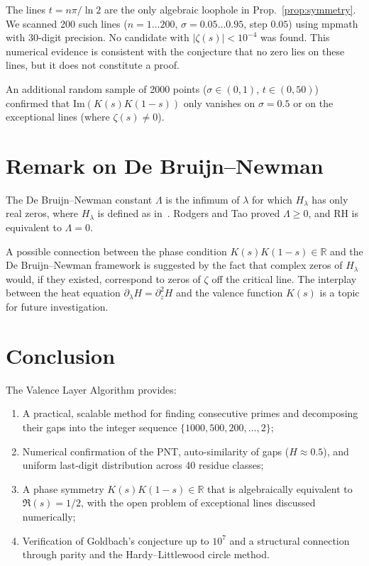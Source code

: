 \documentclass[12pt,a4paper]{article}
\theoremstyle{plain}
\begin{document}
The lines $t=n\pi/\ln2$ are the only algebraic loophole in
Prop.~\ref{prop:symmetry}.  We scanned 200 such lines
($n=1\dots200$, $\sigma=0.05\dots0.95$, step $0.05$) using
mpmath with 30-digit precision.  No candidate with
$|\zeta(s)|<10^{-4}$ was found.  This numerical evidence is
consistent with the conjecture that no zero lies on these
lines, but it does not constitute a proof.

An additional random sample of 2000 points ($\sigma\in(0,1)$,
$t\in(0,50)$) confirmed that Im$(K(s)K(1-s))$ only vanishes on
$\sigma=0.5$ or on the exceptional lines (where $\zeta(s)\neq0$).

\section{Remark on De Bruijn--Newman}
\label{sec:dbn}

The De Bruijn--Newman constant $\Lambda$ is the infimum of $\lambda$
for which $H_\lambda$ has only real zeros, where $H_\lambda$ is
defined as in~\cite{rodgers-tao}.  Rodgers and Tao proved
$\Lambda\ge0$, and RH is equivalent to $\Lambda=0$.

A possible connection between the phase condition
$K(s)K(1-s)\in\mathbb{R}$ and the De Bruijn--Newman framework is
suggested by the fact that complex zeros of $H_\lambda$ would, if
they existed, correspond to zeros of $\zeta$ off the critical line.
The interplay between the heat equation $\partial_\lambda H =
\partial_z^2 H$ and the valence function $K(s)$ is a topic for
future investigation.

\section{Conclusion}
\label{sec:conc}

The Valence Layer Algorithm provides:
\begin{enumerate}
  \item A practical, scalable method for finding consecutive primes
    and decomposing their gaps into the integer sequence
    $\{1000,500,200,\dots,2\}$;
  \item Numerical confirmation of the PNT, auto-similarity of gaps
    ($H\approx0.5$), and uniform last-digit distribution across
    40 residue classes;
  \item A phase symmetry $K(s)K(1-s)\in\mathbb{R}$ that is
    algebraically equivalent to $\Re(s)=1/2$, with the open
    problem of exceptional lines discussed numerically;
  \item Verification of Goldbach's conjecture up to $10^7$ and
    a structural connection through parity and the Hardy--Littlewood
    circle method.
\end{enumerate}
\end{document}
